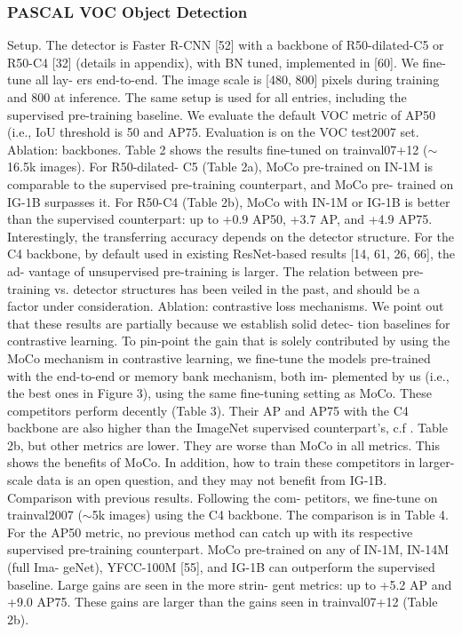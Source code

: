 \documentclass[10pt,twocolumn]{article}  %
\begin{document}
\subsubsection{PASCAL VOC Object Detection}
Setup. The detector is Faster R-CNN [52] with a backbone
of R50-dilated-C5 or R50-C4 [32] (details in appendix),
with BN tuned, implemented in [60]. We ﬁne-tune all lay-
ers end-to-end. The image scale is [480, 800] pixels during
training and 800 at inference. The same setup is used for all
entries, including the supervised pre-training baseline. We
evaluate the default VOC metric of AP50 (i.e., IoU threshold
is 50%
and AP75. Evaluation is on the VOC test2007 set.
Ablation: backbones. Table 2 shows the results ﬁne-tuned
on trainval07+12 ($\sim $16.5k images). For R50-dilated-
C5 (Table 2a), MoCo pre-trained on IN-1M is comparable
to the supervised pre-training counterpart, and MoCo pre-
trained on IG-1B surpasses it. For R50-C4 (Table 2b),
MoCo with IN-1M or IG-1B is better than the supervised
counterpart: up to +0.9 AP50, +3.7 AP, and +4.9 AP75.
Interestingly, the transferring accuracy depends on the
detector structure. For the C4 backbone, by default used
in existing ResNet-based results [14, 61, 26, 66], the ad-
vantage of unsupervised pre-training is larger. The relation
between pre-training vs. detector structures has been veiled
in the past, and should be a factor under consideration.
Ablation: contrastive loss mechanisms. We point out that
these results are partially because we establish solid detec-
tion baselines for contrastive learning. To pin-point the gain
that is solely contributed by using the MoCo mechanism
in contrastive learning, we ﬁne-tune the models pre-trained
with the end-to-end or memory bank mechanism, both im-
plemented by us (i.e., the best ones in Figure 3), using the
same ﬁne-tuning setting as MoCo.
These competitors perform decently (Table 3). Their AP
and AP75 with the C4 backbone are also higher than the
ImageNet supervised counterpart's, c.f . Table 2b, but other
metrics are lower. They are worse than MoCo in all metrics.
This shows the beneﬁts of MoCo. In addition, how to train
these competitors in larger-scale data is an open question,
and they may not beneﬁt from IG-1B.
Comparison with previous results. Following the com-
petitors, we ﬁne-tune on trainval2007 ($\sim $5k images)
using the C4 backbone. The comparison is in Table 4.
For the AP50 metric, no previous method can catch
up with its respective supervised pre-training counterpart.
MoCo pre-trained on any of IN-1M, IN-14M (full Ima-
geNet), YFCC-100M [55], and IG-1B can outperform the
supervised baseline. Large gains are seen in the more strin-
gent metrics: up to +5.2 AP and +9.0 AP75. These gains are
larger than the gains seen in trainval07+12 (Table 2b).
\end{document}
